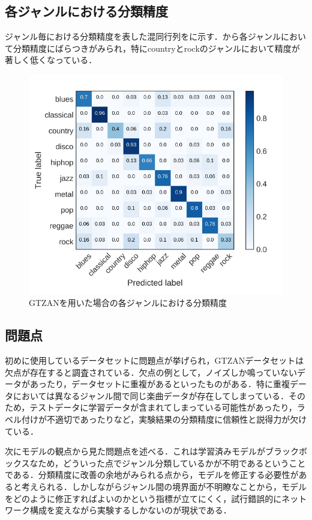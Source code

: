 \clearpage
\subsection{各ジャンルにおける分類精度}
ジャンル毎における分類精度を表した混同行列をに示す．から各ジャンルにおいて分類精度にばらつきがみられ，特にcountryとrockのジャンルにおいて精度が著しく低くなっている．
\begin{figure}[htbp]
	\begin{center}
		\includegraphics[scale=0.7]{./images/old-study/matrix.png}
		\caption{GTZANを用いた場合の各ジャンルにおける分類精度}
		\label{fig:mingwen-table}
	\end{center}
\end{figure}

\subsection{問題点}\label{cnn-problem}
初めに使用しているデータセットに問題点が挙げられ，GTZANデータセットは欠点が存在すると調査されている\cite{gtzanissue}．欠点の例として，ノイズしか鳴っていないデータがあったり，データセットに重複があるといったものがある．特に重複データにおいては異なるジャンル間で同じ楽曲データが存在してしまっている．そのため，テストデータに学習データが含まれてしまっている可能性があったり，ラベル付けが不適切であったりなど，実験結果の分類精度に信頼性と説得力が欠けている．


次にモデルの観点から見た問題点を述べる．これは学習済みモデルがブラックボックスなため，どういった点でジャンル分類しているかが不明であるということである．分類精度に改善の余地がみられる点から，モデルを修正する必要性があると考えられる．しかしながらジャンル間の境界面が不明瞭なことから，モデルをどのように修正すればよいのかという指標が立てにくく，試行錯誤的にネットワーク構成を変えながら実験するしかないのが現状である．

